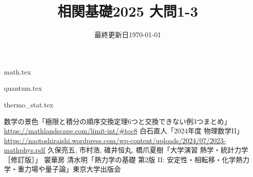 \documentclass{jlreq}
\title{相関基礎2025 大問1-3}
\author{\emoji{deciduous-tree}}
\date{最終更新日\today }
\begin{document}
\maketitle
  
{math.tex}

\pagebreak

{quantum.tex}

\pagebreak

{thermo_stat.tex}
  
\begin{thebibliography}{99}
    数学の景色「極限と積分の順序交換定理6つと交換できない例3つまとめ」\url{https://mathlandscape.com/limit-int/#toc8}
    白石直人「2024年度 物理数学II」\url{https://naotoshiraishi.wordpress.com/wp-content/uploads/2024/07/2023-mathphys.pdf}
    久保亮五, 市村浩, 碓井恒丸, 橋爪夏樹「大学演習 熱学・統計力学 ［修訂版］」 裳華房
    清水明「熱力学の基礎 第2版 II: 安定性・相転移・化学熱力学・重力場や量子論」東京大学出版会
\end{thebibliography}
  
\end{document}

